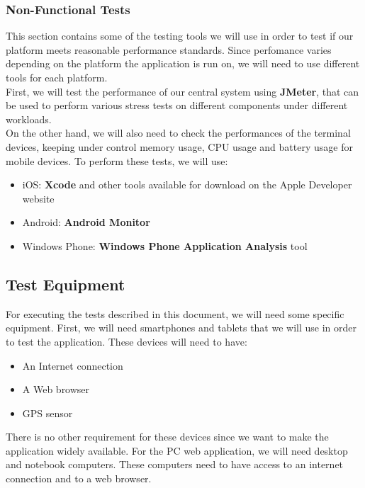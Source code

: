 \documentclass{article}
\begin{document}
\subsubsection{Non-Functional Tests}
This section contains some of the testing tools we will use in order to test if our platform meets reasonable performance standards. Since perfomance varies depending on the platform the application is run on, we will need to use different tools for each platform.\\
First, we will test the performance of our central system using \textbf{JMeter}, that can be used to perform various stress tests on different components under different workloads.\\
On the other hand, we will also need to check the performances of the terminal devices, keeping under control memory usage, CPU usage and battery usage for mobile devices. To perform these tests, we will use:
\begin{itemize}[noitemsep]
\item iOS: \textbf{Xcode} and other tools available for download on the Apple Developer website
\item Android:\textbf{ Android Monitor}
\item Windows Phone: \textbf{Windows Phone Application Analysis} tool
\end{itemize}
\newpage 
\subsection{Test Equipment}
For executing the tests described in this document, we will need some specific equipment. First, we will need smartphones and tablets that we will use in order to test the application. These devices will need to have:
\begin{itemize}[noitemsep]
\item An Internet connection
\item A Web browser
\item GPS sensor
\end{itemize}
There is no other requirement for these devices since we want to make the application widely available.
For the PC web application, we will need desktop and notebook computers. These computers need to have access to an internet connection and to a web browser.
\\
\end{document}
